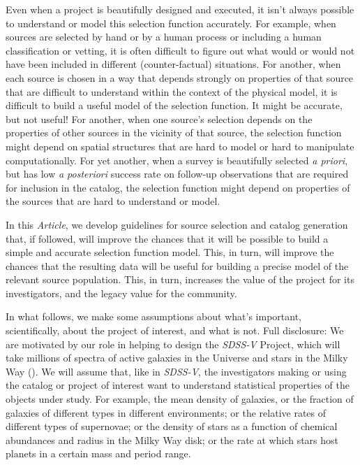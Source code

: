 \documentclass[modern]{aastex62}
\newcommand{\documentname}{\textsl{Article}}
\newcommand{\project}[1]{\textsl{#1}}
\newcommand{\foreign}[1]{\textsl{#1}}
\begin{document}
Even when a project is beautifully designed and
executed, it isn't always possible to understand or model this
selection function accurately.
For example, when sources are selected by hand or by
a human process or including a human classification or vetting, it is often difficult to
figure out what would or would not have been included in different
(counter-factual) situations.
For another, when each source is chosen in a way that depends strongly
on properties of that source that are difficult to understand within
the context of the physical model, it is difficult to build a useful
model of the selection function.
It might be accurate, but not useful!
For another, when one source's selection depends on the properties
of other sources in the vicinity of that source, the selection
function might depend on spatial structures that are hard to model or
hard to manipulate computationally.
For yet another, when a survey is beautifully selected \foreign{a priori},
but has low
\foreign{a posteriori} success rate on follow-up observations that
are required for inclusion in the catalog, the selection
function might depend on properties of the sources that are hard to
understand or model.

In this \documentname, we develop guidelines for source selection and
catalog generation
that, if followed, will improve the chances that it will be possible
to build a simple and accurate selection function model.
This, in turn, will improve the chances that the resulting data
will be useful for building a precise model of the relevant source
population.
This, in turn, increases the value of the project for its investigators,
and the legacy value for the community.

In what follows, we make some assumptions about what's important,
scientifically, about the project of interest, and what is not.
Full disclosure: We are motivated by our role in helping to design the
\project{SDSS-V} Project, which will take millions of spectra of
active galaxies in the Universe and stars in the Milky Way
(\citealt{sdssv}).
We will assume that, like in \project{SDSS-V}, the investigators
making or using the catalog or project of interest want to understand
statistical properties of the objects under study.
For example, the mean density of galaxies, or the fraction of galaxies
of different types in different environments;
or the relative rates of different types of supernovae;
or the density of stars as a function of chemical abundances and radius in the Milky Way disk;
or the rate at which stars host planets in a certain mass and period range.
\end{document}

